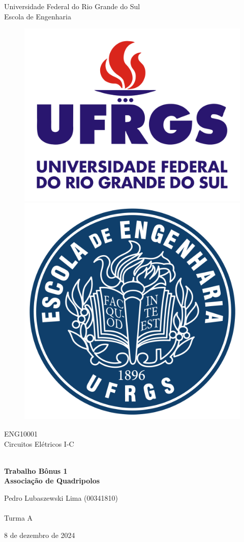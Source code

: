 \documentclass{report}
\begin{document}
    \begin{titlepage}
        \centering
        
        \LARGE {Universidade Federal do Rio Grande do Sul \\ Escola de Engenharia}
    
        \begin{figure}[h!]
        \centering
        \subfigure
        {\includegraphics[width=0.35\linewidth]{images/logos/UFRGS.png}}
        \hspace{1cm}
        \subfigure
        {\includegraphics[width=0.3\linewidth]{images/logos/EE.png}}
        \end{figure}
    
        \LARGE {ENG10001 \\ Circuitos Elétricos I-C}
        
        \vfill
        {\noindent\hrulefill \\
        \bfseries \Huge{Trabalho Bônus 1} \\ \LARGE{Associação de Quadripolos} \\
        \noindent\hrulefill}
        
        \vfill
        {\LARGE Pedro Lubaszewski Lima (00341810) \\~\\ Turma A}
    
        \vfill
        {\LARGE 8 de dezembro de 2024}
        
    \end{titlepage}

        \renewcommand{\contentsname}{Sumário}
        \tableofcontents
        \clearpage
\end{document}
